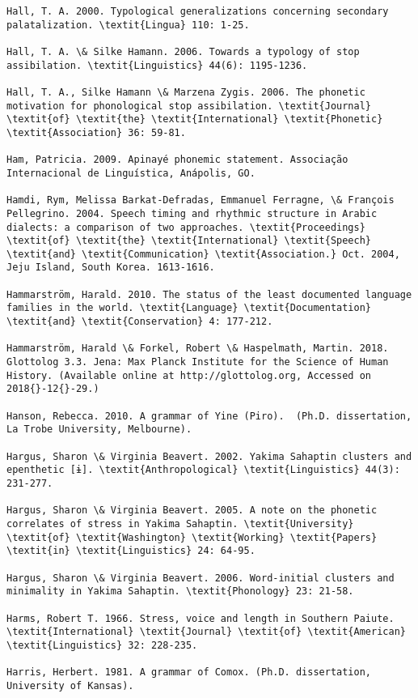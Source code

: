 \begin{verbatim}
Hall, T. A. 2000. Typological generalizations concerning secondary palatalization. \textit{Lingua} 110: 1-25.

Hall, T. A. \& Silke Hamann. 2006. Towards a typology of stop assibilation. \textit{Linguistics} 44(6): 1195-1236.

Hall, T. A., Silke Hamann \& Marzena Zygis. 2006. The phonetic motivation for phonological stop assibilation. \textit{Journal} \textit{of} \textit{the} \textit{International} \textit{Phonetic} \textit{Association} 36: 59-81.

Ham, Patricia. 2009. Apinayé phonemic statement. Associação Internacional de Linguística, Anápolis, GO.

Hamdi, Rym, Melissa Barkat-Defradas, Emmanuel Ferragne, \& François Pellegrino. 2004. Speech timing and rhythmic structure in Arabic dialects: a comparison of two approaches. \textit{Proceedings} \textit{of} \textit{the} \textit{International} \textit{Speech} \textit{and} \textit{Communication} \textit{Association.} Oct. 2004, Jeju Island, South Korea. 1613-1616.

Hammarström, Harald. 2010. The status of the least documented language families in the world. \textit{Language} \textit{Documentation} \textit{and} \textit{Conservation} 4: 177-212.

Hammarström, Harald \& Forkel, Robert \& Haspelmath, Martin. 2018. Glottolog 3.3. Jena: Max Planck Institute for the Science of Human History. (Available online at http://glottolog.org, Accessed on 2018{}-12{}-29.)

Hanson, Rebecca. 2010. A grammar of Yine (Piro).  (Ph.D. dissertation, La Trobe University, Melbourne).

Hargus, Sharon \& Virginia Beavert. 2002. Yakima Sahaptin clusters and epenthetic [ɨ]. \textit{Anthropological} \textit{Linguistics} 44(3): 231-277.

Hargus, Sharon \& Virginia Beavert. 2005. A note on the phonetic correlates of stress in Yakima Sahaptin. \textit{University} \textit{of} \textit{Washington} \textit{Working} \textit{Papers} \textit{in} \textit{Linguistics} 24: 64-95.

Hargus, Sharon \& Virginia Beavert. 2006. Word-initial clusters and minimality in Yakima Sahaptin. \textit{Phonology} 23: 21-58.

Harms, Robert T. 1966. Stress, voice and length in Southern Paiute. \textit{International} \textit{Journal} \textit{of} \textit{American} \textit{Linguistics} 32: 228-235.

Harris, Herbert. 1981. A grammar of Comox. (Ph.D. dissertation, University of Kansas).


\end{verbatim}
